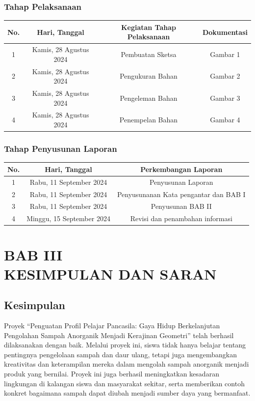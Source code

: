 \documentclass[a4paper,12pt, bahasa]{article}
\begin{document}
 \subsubsection{Tahap Pelaksanaan}
 \begin{table}[ht]
     \centering
     \begin{tabular}{|c|c|c|c|}
     \hline
     \rowcolor[HTML]{9B9B9B}
     No. & Hari, Tanggal  & Kegiatan Tahap Pelaksanaan & Dokumentasi\\ \hline
     1 & Kamis, 28 Agustus 2024  & Pembuatan Sketsa & Gambar 1\\ \hline
     2 & Kamis, 28 Agustus 2024 & Pengukuran Bahan & Gambar 2\\ \hline
     3 & Kamis, 28 Agustus 2024 & Pengeleman Bahan & Gambar 3\\ \hline
     4 & Kamis, 28 Agustus 2024 & Penempelan Bahan & Gambar 4\\ \hline
     \end{tabular}
 \end{table}
\subsubsection{Tahap Penyusunan Laporan}
 \begin{table}[ht]
     \centering
     \begin{tabular}{|c|c|c|}
     \hline
     \rowcolor[HTML]{9B9B9B}
     No. & Hari, Tanggal  & Perkembangan Laporan\\ \hline
     1 & Rabu, 11 September 2024  & Penyusunan Laporan\\ \hline
     2 & Rabu, 11 September 2024 & Penyusunanan Kata pengantar dan BAB I\\ \hline
     3 & Rabu, 11 September 2024 & Penyusunan BAB II\\ \hline
     4 & Minggu, 15 September 2024 & Revisi dan penambahan informasi\\ \hline
     \end{tabular}
 \end{table}
 \pagebreak
    \section*{BAB III\\KESIMPULAN DAN SARAN}
\setcounter{section}{3}
 \setcounter{subsection}{0}
\subsection{Kesimpulan}
Proyek “Penguatan Profil Pelajar Pancasila: Gaya Hidup Berkelanjutan Pengolahan Sampah Anorganik Menjadi Kerajinan Geometri” telah berhasil dilaksanakan dengan baik. Melalui proyek ini, siswa tidak hanya belajar tentang pentingnya pengelolaan sampah dan daur ulang, tetapi juga mengembangkan kreativitas dan keterampilan mereka dalam mengolah sampah anorganik menjadi produk yang bernilai. Proyek ini juga berhasil meningkatkan kesadaran lingkungan di kalangan siswa dan masyarakat sekitar, serta memberikan contoh konkret bagaimana sampah dapat diubah menjadi sumber daya yang bermanfaat. 
\end{document}
